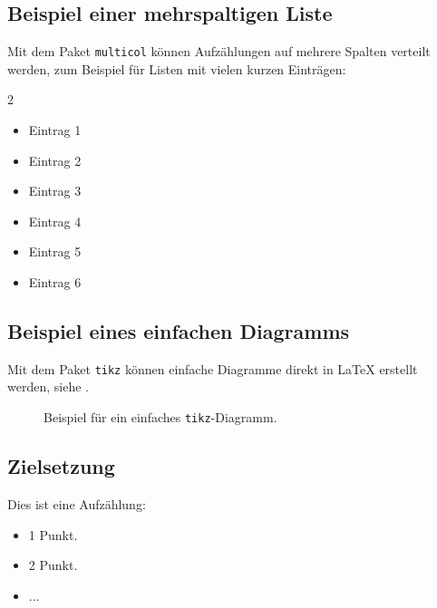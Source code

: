 \subsection{Beispiel einer mehrspaltigen Liste}
\label{subsec:beispiel-multicol}
Mit dem Paket \texttt{multicol} können Aufzählungen auf mehrere Spalten verteilt werden,
zum Beispiel für Listen mit vielen kurzen Einträgen: 

\begin{multicols}{2}
    \begin{itemize}
        \item Eintrag 1
        \item Eintrag 2
        \item Eintrag 3
        \item Eintrag 4
        \item Eintrag 5
        \item Eintrag 6
    \end{itemize}
\end{multicols}

\subsection{Beispiel eines einfachen Diagramms}
\label{subsec:beispiel-tikz}
Mit dem Paket \texttt{tikz} können einfache Diagramme direkt in \LaTeX{} erstellt werden,
siehe .

\begin{figure}[h!]
    \centering
    \caption{Beispiel für ein einfaches \texttt{tikz}-Diagramm.}
    \label{fig:beispiel-tikz}
\end{figure}

\FloatBarrier


\subsection{Zielsetzung}
Dies ist eine Aufzählung:
\begin{itemize}
    \item 1 Punkt.
    \item 2 Punkt.
    \item ...
\end{itemize}


